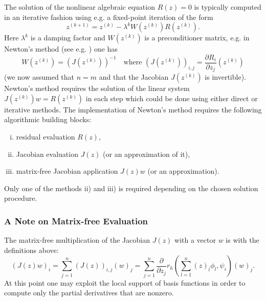 \documentclass[a4paper,12pt]{article}
\begin{document}
The solution of the nonlinear algebraic equation $R(z)=0$ is typically computed
in an iterative fashion using e.g. a fixed-point iteration of the form
\begin{equation}
z^{(k+1)} = z^{(k)} - \lambda^{k} W(z^{(k)}) R(z^{(k)}) .
\end{equation}
Here $\lambda^{k}$ is a damping factor
and $W(z^{(k)})$ is a preconditioner matrix, e.g. in Newton's method (see e.g. \cite{Braess}) one
has 
\begin{equation*}
W(z^{(k)}) = (J(z^{(k)}))^{-1} \quad \text{where $(J(z^{(k)}))_{i,j} = \frac{\partial R_i}{\partial z_j}
(z^{(k)})$}
\end{equation*}
(we now assumed that $n=m$ and that the Jacobian $J(z^{(k)})$ is invertible).
Newton's method requires the solution of the linear system $J(z^{(k)}) w = R(z^{(k)})$ in each
step which could be done using either direct or iterative methods.
The implementation of  Newton's method requires the following
algorithmic building blocks:
\begin{enumerate}[i)]
\item residual evaluation $R(z)$,
\item Jacobian evaluation $J(z)$ (or an approximation of it),
\item matrix-free Jacobian application $J(z) w$ (or an approximation).
\end{enumerate}
Only one of the methods ii) and iii) is required depending on the chosen
solution procedure.

\subsubsection*{A Note on Matrix-free Evaluation}

The matrix-free multiplication of the Jacobian $J(z)$ with a vector $w$ is with
the definitions above:
\begin{equation*}
(J(z) w)_i = \sum_{j=1}^n (J(z))_{i,j} (w)_j = \sum_{j=1}^n 
\frac{\partial}{\partial z_j} r_h\left(\sum_{l=1}^n (z)_l  \phi_l,\psi_i\right) (w)_j .
\end{equation*}
At this point one may exploit the local support of basis functions in order
to compute only the partial derivatives that are nonzero.
\end{document}
